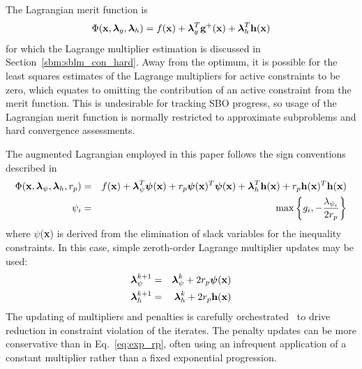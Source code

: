 The Lagrangian merit function is
\begin{equation}
\Phi({\bf x}, \mbox{\boldmath $\lambda$}_g, \mbox{\boldmath
$\lambda$}_h) = f({\bf x})
+ \mbox{\boldmath $\lambda$}_g^T {\bf g}^+({\bf x})
+ \mbox{\boldmath $\lambda$}_h^T {\bf h}({\bf x}) \label{eq:lag_merit}
\end{equation}
for which the Lagrange multiplier estimation is discussed in
Section~\ref{sbm:sblm_con_hard}.
Away from the optimum, it is possible for the least squares estimates
of the Lagrange multipliers for active constraints to be zero, which
equates to omitting the contribution of an active constraint from the
merit function.  This is undesirable for tracking SBO progress, so
usage of the Lagrangian merit function is normally restricted to
approximate subproblems and hard convergence assessments.

The augmented Lagrangian employed in this paper follows the sign
conventions described in~\cite{Van84}
\begin{eqnarray}
\Phi({\bf x}, \mbox{\boldmath $\lambda$}_{\psi}, \mbox{\boldmath
$\lambda$}_h, r_p) & = & f({\bf x})
+ \mbox{\boldmath $\lambda$}_{\psi}^T \mbox{\boldmath $\psi$}({\bf x})
+ r_p \mbox{\boldmath $\psi$}({\bf x})^T \mbox{\boldmath $\psi$}({\bf x})
+ \mbox{\boldmath $\lambda$}_h^T {\bf h}({\bf x})
+ r_p {\bf h}({\bf x})^T {\bf h}({\bf x}) \label{eq:aug_lag_merit} \\
\psi_i & = & \max\left\{g_i, -\frac{\lambda_{\psi_i}}{2r_p}\right\}
\label{eq:aug_lag_psi}
\end{eqnarray}
where {\boldmath $\psi$}({\bf x}) is derived from the elimination of
slack variables for the inequality constraints.  In this case, simple
zeroth-order Lagrange multiplier updates may be used:
\begin{eqnarray}
\mbox{\boldmath $\lambda$}_{\psi}^{k+1} & = & \mbox{\boldmath
$\lambda$}_{\psi}^k + 2r_p\mbox{\boldmath $\psi$}({\bf x})
\label{eq:lambda_psi} \\ 
\mbox{\boldmath $\lambda$}_h^{k+1} & = & \mbox{\boldmath $\lambda$}_h^k 
+ 2 r_p {\bf h}({\bf x})
\label{eq:lambda_h}
\end{eqnarray}
The updating of multipliers and penalties is carefully
orchestrated~\cite{Con00} to drive reduction in constraint
violation of the iterates.  The penalty updates can be more
conservative than in Eq.~\ref{eq:exp_rp}, often using an infrequent
application of a constant multiplier rather than a fixed exponential
progression.

